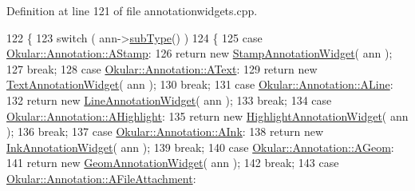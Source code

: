 Definition at line 121 of file annotationwidgets.\+cpp.


\begin{DoxyCode}
122 \{
123     \textcolor{keywordflow}{switch} ( ann->\hyperlink{classOkular_1_1Annotation_af9833449767eacd740f377e69a1fdd48}{subType}() )
124     \{
125         \textcolor{keywordflow}{case} \hyperlink{classOkular_1_1Annotation_af71b46e37d5f850b97d5c4de3be9aac0ad542ded420c9b01f44ee923bf28ecd9a}{Okular::Annotation::AStamp}:
126             \textcolor{keywordflow}{return} \textcolor{keyword}{new} \hyperlink{classStampAnnotationWidget}{StampAnnotationWidget}( ann );
127             \textcolor{keywordflow}{break};
128         \textcolor{keywordflow}{case} \hyperlink{classOkular_1_1Annotation_af71b46e37d5f850b97d5c4de3be9aac0a48f93d5a9352abc4e38a45f69075e504}{Okular::Annotation::AText}:
129             \textcolor{keywordflow}{return} \textcolor{keyword}{new} \hyperlink{classTextAnnotationWidget}{TextAnnotationWidget}( ann );
130             \textcolor{keywordflow}{break};
131         \textcolor{keywordflow}{case} \hyperlink{classOkular_1_1Annotation_af71b46e37d5f850b97d5c4de3be9aac0a7035dc978d8b79958f34e3d164838726}{Okular::Annotation::ALine}:
132             \textcolor{keywordflow}{return} \textcolor{keyword}{new} \hyperlink{classLineAnnotationWidget}{LineAnnotationWidget}( ann );
133             \textcolor{keywordflow}{break};
134         \textcolor{keywordflow}{case} \hyperlink{classOkular_1_1Annotation_af71b46e37d5f850b97d5c4de3be9aac0a03e002f9ae62005b2d7c7f1445507501}{Okular::Annotation::AHighlight}:
135             \textcolor{keywordflow}{return} \textcolor{keyword}{new} \hyperlink{classHighlightAnnotationWidget}{HighlightAnnotationWidget}( ann );
136             \textcolor{keywordflow}{break};
137         \textcolor{keywordflow}{case} \hyperlink{classOkular_1_1Annotation_af71b46e37d5f850b97d5c4de3be9aac0a4ed60063584ceb146c2a378f0df4ed37}{Okular::Annotation::AInk}:
138             \textcolor{keywordflow}{return} \textcolor{keyword}{new} \hyperlink{classInkAnnotationWidget}{InkAnnotationWidget}( ann );
139             \textcolor{keywordflow}{break};
140         \textcolor{keywordflow}{case} \hyperlink{classOkular_1_1Annotation_af71b46e37d5f850b97d5c4de3be9aac0a2c11d328af34f5526fd9e761297fb3c2}{Okular::Annotation::AGeom}:
141             \textcolor{keywordflow}{return} \textcolor{keyword}{new} \hyperlink{classGeomAnnotationWidget}{GeomAnnotationWidget}( ann );
142             \textcolor{keywordflow}{break};
143         \textcolor{keywordflow}{case} \hyperlink{classOkular_1_1Annotation_af71b46e37d5f850b97d5c4de3be9aac0a7209cbfb5e13c0f80ac36f87c9575836}{Okular::Annotation::AFileAttachment}:

\end{DoxyCode}
